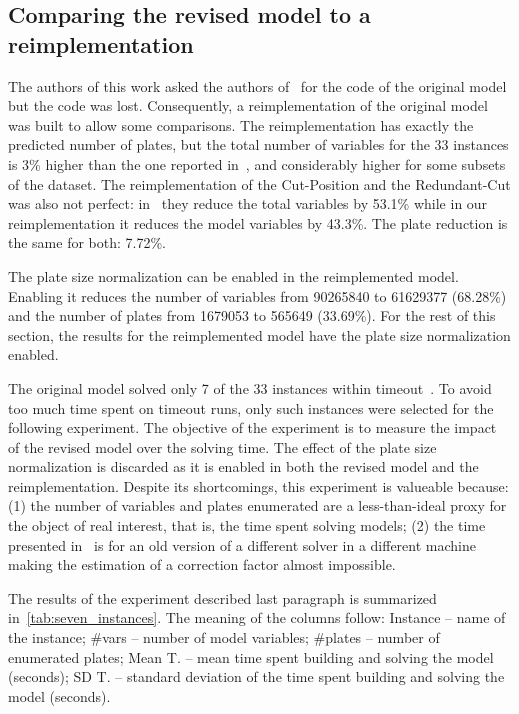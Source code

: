 \documentclass[runningheads]{llncs}
\begin{document}
\subsection{Comparing the revised model to a reimplementation}

The authors of this work asked the authors of~\cite{furini:2016} for the code of the original model but the code was lost.
Consequently, a reimplementation of the original model was built to allow some comparisons.
The reimplementation has exactly the predicted number of plates, but the total number of variables for the 33 instances is 3\% higher than the one reported in~\cite{furini:2016}, and considerably higher for some subsets of the dataset.
The reimplementation of the Cut-Position and the Redundant-Cut was also not perfect: in~\cite{dimitri_thesis} they reduce the total variables by 53.1\% while in our reimplementation it reduces the model variables by 43.3\%.
The plate reduction is the same for both: 7.72\%.

The plate size normalization can be enabled in the reimplemented model.
Enabling it reduces the number of variables from 90265840 to 61629377 (68.28\%) and the number of plates from 1679053 to 565649 (33.69\%).
For the rest of this section, the results for the reimplemented model have the plate size normalization enabled.

The original model solved only 7 of the 33 instances within timeout~\cite{furini:2016}.
To avoid too much time spent on timeout runs, only such instances were selected for the following experiment.
The objective of the experiment is to measure the impact of the revised model over the solving time. 
The effect of the plate size normalization is discarded as it is enabled in both the revised model and the reimplementation.
Despite its shortcomings, this experiment is valueable because: (1) the number of variables and plates enumerated are a less-than-ideal proxy for the object of real interest, that is, the time spent solving models; (2) the time presented in~\cite{furini:2016} is for an old version of a different solver in a different machine making the estimation of a correction factor almost impossible.

The results of the experiment described last paragraph is summarized in~\autoref{tab:seven_instances}.
The meaning of the columns follow: 
Instance -- name of the instance; \#vars -- number of model variables; \#plates -- number of enumerated plates; Mean T. -- mean time spent building and solving the model (seconds); SD T. -- standard deviation of the time spent building and solving the model (seconds).
\end{document}
